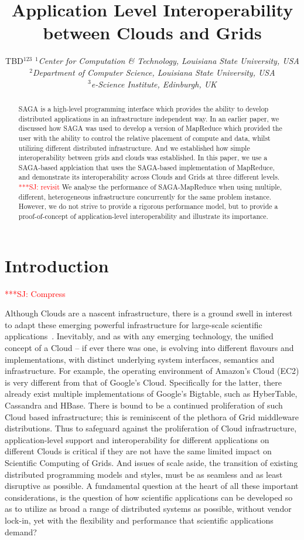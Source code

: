 \documentclass[conference,final]{IEEEtran}
\title{Application Level Interoperability between Clouds and Grids}
\author{TBD$^{123}$
  \small{\emph{$^{1}$Center for Computation \& Technology, Louisiana
      State University, USA}}\\
  \small{\emph{$^{2}$Department of Computer Science, Louisiana State
      University, USA}}\\
  \small{\emph{$^{3}$e-Science Institute, Edinburgh, UK}}\\
}
\newcommand{\jhanote}[1]{ {\textcolor{red} { ***SJ: #1 }}}
\newcommand{\jhanote}[1]{}
\newcommand{\sagamapreduce }{SAGA-MapReduce }
\begin{document}
\maketitle

\begin{abstract}
  SAGA is a high-level programming interface which provides the
  ability to develop distributed applications in an infrastructure
  independent way. In an earlier paper, we discussed how SAGA was used
  to develop a version of MapReduce which provided the user with the
  ability to control the relative placement of compute and data,
  whilst utilizing different distributed infrastructure. And we
  established how simple interoperability between grids and clouds was
  established. In this paper, we use a SAGA-based applciation that
  uses the SAGA-based implementation of MapReduce, and demonstrate its
  interoperability across Clouds and Grids at three different levels.
  \jhanote{revisit} We analyse the performance of \sagamapreduce when
  using multiple, different, heterogeneous infrastructure concurrently
  for the same problem instance. However, we do not strive to provide
  a rigorous performance model, but to provide a proof-of-concept of
  application-level interoperability and illustrate its importance.
\end{abstract}

\section{Introduction} 

\jhanote{Compress}

Although Clouds are a nascent infrastructure, there is a ground swell
in interest to adapt these emerging powerful infrastructure for
large-scale scientific applications~\cite{montagecloud}. Inevitably,
and as with any emerging technology, the unified concept of a Cloud --
if ever there was one, is evolving into different flavours and
implementations, with distinct underlying system interfaces, semantics
and infrastructure. For example, the operating environment of Amazon's
Cloud (EC2) is very different from that of Google's
Cloud. Specifically for the latter, there already exist multiple
implementations of Google's Bigtable, such as HyberTable, Cassandra
and HBase. There is bound to be a continued proliferation of such
Cloud based infrastructure; this is reminiscent of the plethora of
Grid middleware distributions. Thus to safeguard against the
proliferation of Cloud infrastructure, application-level support and
interoperability for different applications on different Clouds is
critical if they are not have the same limited impact on Scientific
Computing of Grids. And issues of scale aside, the transition of
existing distributed programming models and styles, must be as
seamless and as least disruptive as possible.  A fundamental question
at the heart of all these important considerations, is the question of
how scientific applications can be developed so as to utilize as broad
a range of distributed systems as possible, without vendor lock-in,
yet with the flexibility and performance that scientific applications
demand?
\end{document}
